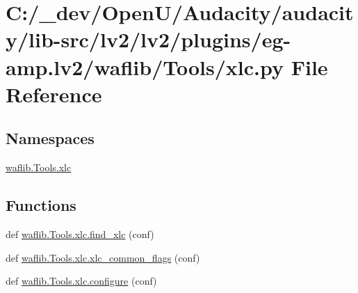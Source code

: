 \hypertarget{lv2_2plugins_2eg-amp_8lv2_2waflib_2_tools_2xlc_8py}{}\section{C\+:/\+\_\+dev/\+Open\+U/\+Audacity/audacity/lib-\/src/lv2/lv2/plugins/eg-\/amp.lv2/waflib/\+Tools/xlc.py File Reference}
\label{lv2_2plugins_2eg-amp_8lv2_2waflib_2_tools_2xlc_8py}
\subsection*{Namespaces}
\begin{DoxyCompactItemize}
\item 
 \hyperlink{namespacewaflib_1_1_tools_1_1xlc}{waflib.\+Tools.\+xlc}
\end{DoxyCompactItemize}
\subsection*{Functions}
\begin{DoxyCompactItemize}
\item 
def \hyperlink{namespacewaflib_1_1_tools_1_1xlc_a826e1c437600d3c067bccbbd4064dec9}{waflib.\+Tools.\+xlc.\+find\+\_\+xlc} (conf)
\item 
def \hyperlink{namespacewaflib_1_1_tools_1_1xlc_ae679a412086a4361649983127db4039d}{waflib.\+Tools.\+xlc.\+xlc\+\_\+common\+\_\+flags} (conf)
\item 
def \hyperlink{namespacewaflib_1_1_tools_1_1xlc_ac8361aabba7f34ddea8a8e153d9d8315}{waflib.\+Tools.\+xlc.\+configure} (conf)
\end{DoxyCompactItemize}
